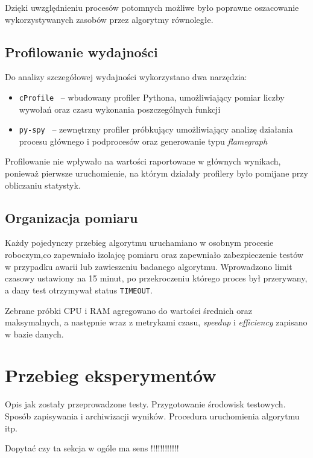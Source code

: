 Dzięki uwzględnieniu procesów potomnych możliwe było poprawne oszacowanie wykorzystywanych zasobów przez algorytmy równoległe.

\subsection{Profilowanie wydajności}

Do analizy szczegółowej wydajności wykorzystano dwa narzędzia:

\begin{itemize}
    \item \texttt{cProfile}~\cite{bib:cProfile} -- wbudowany profiler Pythona, 
    umożliwiający pomiar liczby wywołań oraz czasu wykonania poszczególnych funkcji
    
    \item \texttt{py-spy}~\cite{bib:PySpy} -- zewnętrzny profiler próbkujący umożliwiający analizę 
    działania procesu głównego i podprocesów oraz generowanie typu \textit{flamegraph}
\end{itemize}

Profilowanie nie wpływało na wartości raportowane w głównych wynikach, ponieważ pierwsze uruchomienie, 
na którym działały profilery było pomijane przy obliczaniu statystyk.

\subsection{Organizacja pomiaru}

Każdy pojedynczy przebieg algorytmu uruchamiano w osobnym procesie roboczym,co zapewniało izolajcę pomiaru oraz 
zapewniało zabezpieczenie testów w przypadku awarii lub zawieszeniu badanego algorytmu.
Wprowadzono limit czasowy ustawiony na 15 minut, po przekroczeniu którego proces był przerywany, a dany test otrzymywał status \texttt{TIMEOUT}.

Zebrane próbki CPU i RAM agregowano do wartości średnich oraz maksymalnych, 
a następnie wraz z metrykami czasu, \textit{speedup} i \textit{efficiency} zapisano w bazie danych.

\section{Przebieg eksperymentów}
\label{sec:PrzebiegBadan}

Opis jak zostały przeprowadzone testy. Przygotowanie środowisk testowych. Sposób zapisywania i archiwizacji wyników. Procedura uruchomienia algorytmu itp.

Dopytać czy ta sekcja w ogóle ma sens !!!!!!!!!!!!